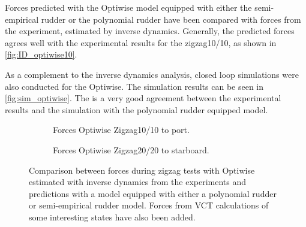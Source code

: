 Forces predicted with the Optiwise model equipped with either the semi-empirical rudder or the polynomial rudder have been compared with forces from the experiment, estimated by inverse dynamics. Generally, the predicted forces agrees well with the experimental results for the zigzag10/10, as shown in \autoref{fig:ID_optiwise10}. 

As a complement to the inverse dynamics analysis, closed loop simulations were also conducted for the Optiwise. The simulation results can be seen in \autoref{fig:sim_optiwise}. The is a very good agreement between the experimental results and the simulation with the polynomial rudder equipped model. 
\begin{figure}[h]
     \centering
     \begin{subfigure}[b]{\textwidth}
         \centering
         
        \caption{Forces Optiwise Zigzag10/10 to port.}
        \label{fig:ID_optiwise10}
     \end{subfigure}
     \vfill
     \begin{subfigure}[b]{\textwidth}
         
        \caption{Forces Optiwise Zigzag20/20 to starboard.}
        \label{fig:ID_optiwise_20}
     \end{subfigure}
        \caption{Comparison between forces during zigzag tests with Optiwise estimated with inverse dynamics from the experiments and predictions with a model equipped with either a polynomial rudder or semi-empirical rudder model. Forces from VCT calculations of some interesting states have also been added.}
        \label{fig:ID_optiwise}
\end{figure}